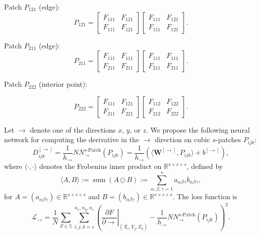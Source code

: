 \documentclass[pdflatex,sn-mathphys-num]{sn-jnl}%
\theoremstyle{thmstyleone}%
\theoremstyle{thmstyletwo}%
\theoremstyle{thmstylethree}%
\begin{document}
{Patch $P_{121}$ (edge):
\[
P_{121}=
\begin{bmatrix}
F_{111} & F_{121}\\
F_{111} & F_{121}
\end{bmatrix}
\begin{bmatrix}
F_{111} & F_{121}\\
F_{111} & F_{121}
\end{bmatrix}.
\]

Patch $P_{211}$ (edge):
\[
P_{211}=
\begin{bmatrix}
F_{111} & F_{111}\\
F_{211} & F_{211}
\end{bmatrix}
\begin{bmatrix}
F_{111} & F_{111}\\
F_{211} & F_{211}
\end{bmatrix}.
\]

Patch $P_{222}$ (interior point):

\[
P_{222}=
\begin{bmatrix}
F_{111} & F_{121}\\
F_{211} & F_{221}
\end{bmatrix}
\begin{bmatrix}
F_{112} & F_{122}\\
F_{212} & F_{222}
\end{bmatrix}.
\]



Let $\to$ denote one of the directions $x$, $y$, or $z$. We propose the following neural network for computing the derivative in the $\to$ direction on cubic $s$-patches $P_{ijk}$:
\[
D^{[\to]}_{ijk} =\frac{1}{h_{\to}}NN_{\to}^{s\text{-Patch}}(P_{ijk})=\frac{1}{h_{\to}}\left( \langle \boldsymbol{W}^{[\to]}, P_{ijk} \rangle + b^{[\to]}\right),
\]
where $\langle\cdot,\cdot\rangle$ denotes the Frobenius inner product on $\mathbb{R}^{s\times s\times s}$, defined by
\[
\langle A,B\rangle:=\operatorname{sum}(A\odot B):=\sum_{\alpha,\beta,\gamma=1}^{s}a_{\alpha\beta\gamma}b_{\alpha\beta\gamma},
\]
for $A=(a_{\alpha\beta\gamma})\in\mathbb{R}^{s\times s\times s}$ and $B=(b_{\alpha\beta\gamma})\in \mathbb{R}^{s\times s\times s}$.
The loss function is
\[
\mathcal{L}_{\to} = \frac{1}{N}\sum_{F\in\mathbb{S}}\sum_{i,j,k=s}^{n_x,n_y,n_z} \left( \left.\frac{\partial F}{\partial \to}\right|_{(X_i,Y_j,Z_k)} - \frac{1}{h_{\to}}NN_{\to}^{s\text{-Patch}}(P_{ijk}) \right)^{\!2}.
\]

}
\end{document}
